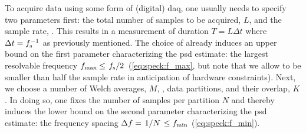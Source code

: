 To acquire data using some form of (digital) \gls{daq}, one usually needs to specify two parameters first: the total number of samples to be acquired, $L$, and the sample rate, \fs.
This results in a measurement of duration $T = L\Delta t$ where $\Delta t = f_{\mathrm{s}}^{-1}$ as previously mentioned.
The choice of \fs already induces an upper bound on the first parameter characterizing the \gls{psd} estimate: the largest resolvable frequency $\fmax\leq\flatfrac{\fs}{2}$ (\cf \cref{eq:speck:f_max}, but note that we allow \fmax to be smaller than half the sample rate in anticipation of hardware constraints).
Next, we choose a number of Welch averages, $M$, \ie, data partitions, and their overlap, $K$.
In doing so, one fixes the number of samples per partition $N$ and thereby induces the lower bound on the second parameter characterizing the \gls{psd} estimate: the frequency spacing $\df = \flatfrac{1}{N} \leq \fmin$ (\cf \cref{eq:speck:f_min}).
